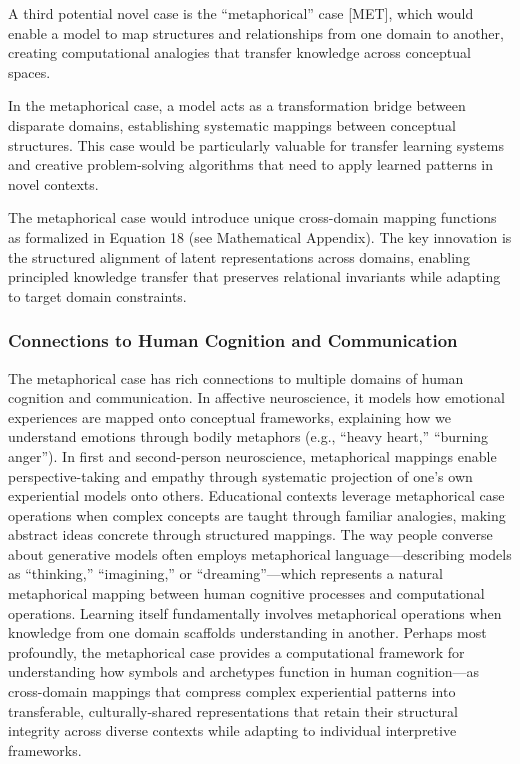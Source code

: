 \documentclass[
]{book}
\begin{document}
A third potential novel case is the ``metaphorical'' case {[}MET{]},
which would enable a model to map structures and relationships from one
domain to another, creating computational analogies that transfer
knowledge across conceptual spaces.

In the metaphorical case, a model acts as a transformation bridge
between disparate domains, establishing systematic mappings between
conceptual structures. This case would be particularly valuable for
transfer learning systems and creative problem-solving algorithms that
need to apply learned patterns in novel contexts.

The metaphorical case would introduce unique cross-domain mapping
functions as formalized in Equation 18 (see Mathematical Appendix). The
key innovation is the structured alignment of latent representations
across domains, enabling principled knowledge transfer that preserves
relational invariants while adapting to target domain constraints.

\hypertarget{connections-to-human-cognition-and-communication}{%
\subsubsection{Connections to Human Cognition and
Communication}\label{connections-to-human-cognition-and-communication}}

The metaphorical case has rich connections to multiple domains of human
cognition and communication. In affective neuroscience, it models how
emotional experiences are mapped onto conceptual frameworks, explaining
how we understand emotions through bodily metaphors (e.g., ``heavy
heart,'' ``burning anger''). In first and second-person neuroscience,
metaphorical mappings enable perspective-taking and empathy through
systematic projection of one's own experiential models onto others.
Educational contexts leverage metaphorical case operations when complex
concepts are taught through familiar analogies, making abstract ideas
concrete through structured mappings. The way people converse about
generative models often employs metaphorical language---describing
models as ``thinking,'' ``imagining,'' or ``dreaming''---which
represents a natural metaphorical mapping between human cognitive
processes and computational operations. Learning itself fundamentally
involves metaphorical operations when knowledge from one domain
scaffolds understanding in another. Perhaps most profoundly, the
metaphorical case provides a computational framework for understanding
how symbols and archetypes function in human cognition---as cross-domain
mappings that compress complex experiential patterns into transferable,
culturally-shared representations that retain their structural integrity
across diverse contexts while adapting to individual interpretive
frameworks.
\end{document}
